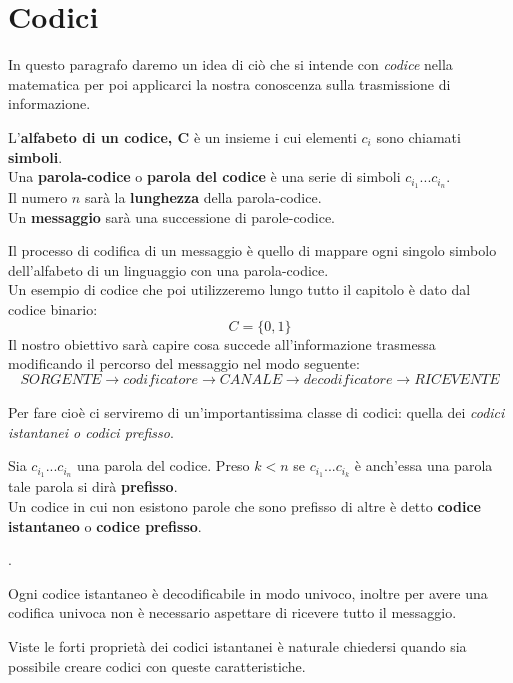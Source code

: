 \section{Codici}
\label{sec:Codici}
\vspace{10pt}

In questo paragrafo daremo un idea di ciò che si intende con \textit{codice} nella matematica per poi applicarci la nostra conoscenza sulla trasmissione di informazione.\\
\begin{defi}
L'\textbf{alfabeto di un codice, C} è un insieme \acode i cui elementi $c_i$ sono chiamati \textbf{simboli}.\\
Una \textbf{parola-codice} o \textbf{parola del codice} è una serie di simboli $c_{i_1}...c_{i_n}$.\\
Il numero $n$ sarà la \textbf{lunghezza} della parola-codice.\\
Un \textbf{messaggio} sarà una successione di parole-codice.
\end{defi}
Il processo di codifica di un messaggio è quello di mappare ogni singolo  simbolo dell'alfabeto di un linguaggio con una parola-codice.\\
Un esempio di codice che poi utilizzeremo lungo tutto il capitolo è dato dal codice binario:
$$C=\{0, 1 \}$$
Il nostro obiettivo sarà capire cosa succede all'informazione trasmessa modificando il percorso del messaggio nel modo seguente:
$$ SORGENTE \to codificatore \to CANALE \to decodificatore \to RICEVENTE$$
\\
Per fare cioè ci serviremo di un'importantissima classe di codici: quella dei \textit{codici istantanei o codici prefisso}.
\begin{defi}
Sia $c_{i_1}...c_{i_n}$ una parola del codice. Preso $k<n$ se  $c_{i_1}...c_{i_k}$
è anch'essa una parola tale parola si dirà \textbf{prefisso}.\\
Un codice in cui non esistono parole che sono prefisso di altre è detto \textbf{codice istantaneo} o \textbf{codice prefisso}.
\end{defi}.
\begin{lem}
Ogni codice istantaneo è decodificabile in modo univoco, inoltre per avere una codifica univoca non è necessario aspettare di ricevere tutto il messaggio.
\end{lem}

Viste le forti proprietà dei codici istantanei è naturale chiedersi quando sia possibile creare codici con queste caratteristiche.

